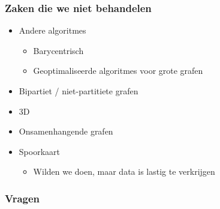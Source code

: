 \documentclass[16pt]{beamer}
\begin{document}
\begin{frame}
    \frametitle{Zaken die we niet behandelen}
    \begin{itemize}
        \item{Andere algoritmes}
        \begin{itemize}
            \item{Barycentrisch}
            \item{Geoptimaliseerde algoritmes voor grote grafen}
        \end{itemize}
        \item{Bipartiet / niet-partitiete grafen}
        \item{3D}
        \item{Onsamenhangende grafen}
        \item{Spoorkaart}
        \begin{itemize}
            \item{Wilden we doen, maar data is lastig te verkrijgen}
        \end{itemize}
    \end{itemize}
\end{frame}

\begin{frame}
    \frametitle{Vragen}
\end{frame}
\end{document}
